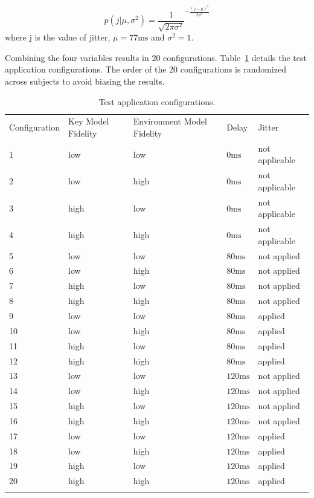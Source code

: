 \begin{equation}
\label{equ:jitter}
p(j|\mu,\sigma^{2})=\frac{1}{\sqrt{2\pi\sigma^{2}}}^{-\frac{(j-\mu)^{2}}{2\sigma^{2}}}
\end{equation}
where j is the value of jitter, $\mu=77\mathrm{ms}$ and $\sigma^{2}=1$.

Combining the four variables results in 20 configurations. Table~\ref{tab:pus} details the test application configurations. The order of the 20 configurations is randomized across subjects to avoid biasing the results.

\begin{table}[!htbp]
\caption{Test application configurations.}
\label{tab:pus}
\begin{tabular}{lllll}
\hline\noalign{\smallskip}
Configuration & Key Model Fidelity & Environment Model Fidelity & Delay & Jitter \\
\noalign{\smallskip}\hline\noalign{\smallskip}
1 & low & low & $0\mathrm{ms}$ & not applicable \\
2 & low & high & $0\mathrm{ms}$ & not applicable \\
3 & high & low & $0\mathrm{ms}$ & not applicable \\
4 & high & high & $0\mathrm{ms}$ & not applicable \\
5 & low & low & $80\mathrm{ms}$ & not applied \\
6 & low & high & $80\mathrm{ms}$ & not applied \\
7 & high & low & $80\mathrm{ms}$ & not applied \\
8 & high & high & $80\mathrm{ms}$ & not applied \\
9 & low & low & $80\mathrm{ms}$ & applied \\
10 & low & high & $80\mathrm{ms}$ & applied \\
11 & high & low & $80\mathrm{ms}$ & applied \\
12 & high & high & $80\mathrm{ms}$ & applied \\
13 & low & low & $120\mathrm{ms}$ & not applied \\
14 & low & high & $120\mathrm{ms}$ & not applied \\
15 & high & low & $120\mathrm{ms}$ & not applied \\
16 & high & high & $120\mathrm{ms}$ & not applied \\
17 & low & low & $120\mathrm{ms}$ & applied \\
18 & low & high & $120\mathrm{ms}$ & applied \\
19 & high & low & $120\mathrm{ms}$ & applied \\
20 & high & high & $120\mathrm{ms}$ & applied \\
\noalign{\smallskip}\hline
\end{tabular}
\end{table}

